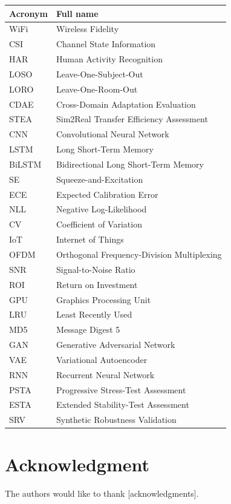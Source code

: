 \documentclass[journal]{IEEEtran}
\begin{document}
\begin{table}[h]
\centering
\begin{tabular}{@{}ll@{}}
\toprule
\textbf{Acronym} & \textbf{Full name} \\
\midrule
WiFi & Wireless Fidelity \\
CSI & Channel State Information \\
HAR & Human Activity Recognition \\
LOSO & Leave-One-Subject-Out \\
LORO & Leave-One-Room-Out \\
CDAE & Cross-Domain Adaptation Evaluation \\
STEA & Sim2Real Transfer Efficiency Assessment \\
CNN & Convolutional Neural Network \\
LSTM & Long Short-Term Memory \\
BiLSTM & Bidirectional Long Short-Term Memory \\
SE & Squeeze-and-Excitation \\
ECE & Expected Calibration Error \\
NLL & Negative Log-Likelihood \\
CV & Coefficient of Variation \\
IoT & Internet of Things \\
OFDM & Orthogonal Frequency-Division Multiplexing \\
SNR & Signal-to-Noise Ratio \\
ROI & Return on Investment \\
GPU & Graphics Processing Unit \\
LRU & Least Recently Used \\
MD5 & Message Digest 5 \\
GAN & Generative Adversarial Network \\
VAE & Variational Autoencoder \\
RNN & Recurrent Neural Network \\
PSTA & Progressive Stress-Test Assessment \\
ESTA & Extended Stability-Test Assessment \\
SRV & Synthetic Robustness Validation \\
\bottomrule
\end{tabular}
\end{table}

\section*{Acknowledgment}

The authors would like to thank [acknowledgments].




\end{document}
